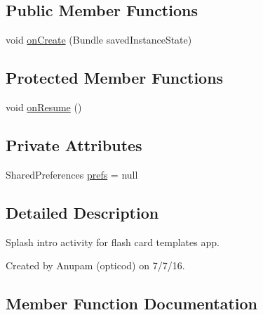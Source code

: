 \subsection*{Public Member Functions}
\begin{DoxyCompactItemize}
\item 
void \hyperlink{classorg_1_1buildmlearn_1_1learnwithflashcards_1_1activities_1_1SplashActivity_ad164d92d3f076f93875106c5f163e9e4}{on\+Create} (Bundle saved\+Instance\+State)
\end{DoxyCompactItemize}
\subsection*{Protected Member Functions}
\begin{DoxyCompactItemize}
\item 
void \hyperlink{classorg_1_1buildmlearn_1_1learnwithflashcards_1_1activities_1_1SplashActivity_adae30974670cea5dab254e1040b282de}{on\+Resume} ()
\end{DoxyCompactItemize}
\subsection*{Private Attributes}
\begin{DoxyCompactItemize}
\item 
Shared\+Preferences \hyperlink{classorg_1_1buildmlearn_1_1learnwithflashcards_1_1activities_1_1SplashActivity_afa05a7d0030effbba7fad4c5564c8558}{prefs} = null
\end{DoxyCompactItemize}


\subsection{Detailed Description}
Splash intro activity for flash card template\textquotesingle{}s app. 

Created by Anupam (opticod) on 7/7/16. 

\subsection{Member Function Documentation}
